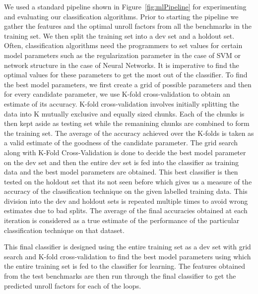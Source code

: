 \documentclass[]{sig-alternate}
\begin{document}
We used a standard pipeline shown in Figure~\ref{fig:mlPipeline} for experimenting and evaluating our classification algorithms. Prior to starting the pipeline we gather the features and the optimal unroll factors from all the benchmarks in the training set. We then split the training set into a dev set and a holdout set. Often, classification algorithms need the programmers to set values for certain model parameters such as the regularization parameter in the case of SVM or network structure in the case of Neural Networks. It is imperative to find the optimal values for these parameters to get the most out of the classifier. To find the best model parameters, we first create a grid of possible parameters and then for every candidate parameter, we use K-fold cross-validation to obtain an estimate of its accuracy. K-fold cross-validation involves initially splitting the data into K mutually exclusive and equally sized chunks. Each of the chunks is then kept aside as testing set while the remanining chunks are combined to form the training set. The average of the accuracy achieved over the K-folds is taken as a valid estimate of the goodness of the candidate parameter. The grid search along with K-Fold Cross-Validation is done to decide the best model parameter on the dev set and then the entire dev set is fed into the classifier as training data and the best model parameters are obtained. This best classifier is then tested on the holdout set that its not seen before which gives us a measure of the accuracy of the classification technique on the given labelled training data. This division into the dev and holdout sets is repeated multiple times to avoid wrong estimates due to bad splits. The average of the final accuracies obtained at each iteration is considered as a true estimate of the performance of the particular classification technique on that dataset. 

This final classifier is designed using the entire training set as a dev set with grid search and K-fold cross-validation to find the best model parameters using which the entire training set is fed to the classifier for learning. The features obtained from the test benchmarks are then run through the final classifier to get the predicted unroll factors for each of the loops. 
\end{document}
